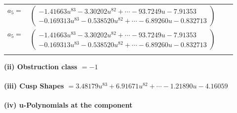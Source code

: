 \documentclass[1p]{elsarticle_modified}
\theoremstyle{definition}
\begin{document}
\begin{tabular}{m{7pt} m{180pt} m{7pt} m{180pt} }
\flushright $a_{5}=$&$\begin{pmatrix}-1.41663 u^{83}-3.30202 u^{82}+\cdots-93.7249 u-7.91353\\-0.169313 u^{83}-0.538520 u^{82}+\cdots-6.89260 u-0.832713\end{pmatrix}$\\ \flushright $a_{5}=$&$\begin{pmatrix}-1.41663 u^{83}-3.30202 u^{82}+\cdots-93.7249 u-7.91353\\-0.169313 u^{83}-0.538520 u^{82}+\cdots-6.89260 u-0.832713\end{pmatrix}$\\&\end{tabular}
\flushleft \textbf{(ii) Obstruction class $= -1$}\\~\\
\flushleft \textbf{(iii) Cusp Shapes $= 3.48179 u^{83}+6.91671 u^{82}+\cdots-1.21890 u-4.16059$}\\~\\
\newpage\renewcommand{\arraystretch}{1}
\flushleft \textbf{(iv) u-Polynomials at the component}\newline \\
\end{document}
